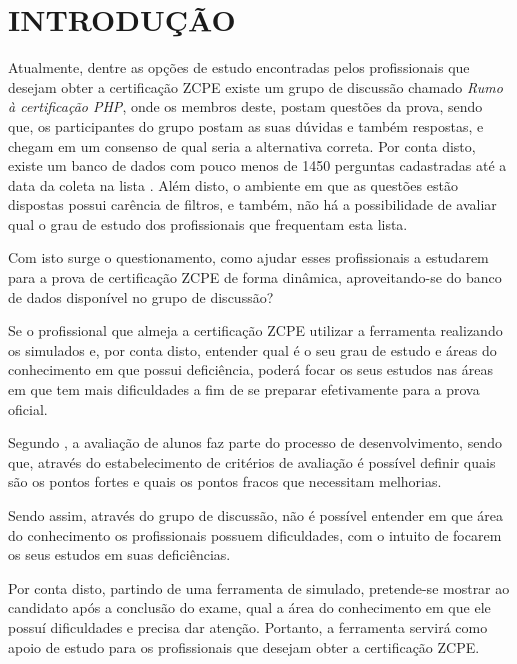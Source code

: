\chapter{INTRODUÇÃO}
\label{chp:intro}

Atualmente, dentre as opções de estudo encontradas pelos
profissionais que desejam obter a certificação \ac{ZCPE} existe um
grupo de discussão chamado \textit{Rumo à certificação PHP}, onde os membros
deste, postam questões da prova, sendo que, os participantes do grupo postam as
suas dúvidas e também respostas, e chegam em um consenso de qual seria a
alternativa correta. Por conta disto, existe um banco de dados com pouco menos
de 1450 perguntas cadastradas até a data da coleta na lista
\cite{googleGroupsRumoACertificaoPHP}. Além disto, o ambiente em que as
questões estão dispostas possui carência de filtros, e também, não há a
possibilidade de avaliar qual o grau de estudo dos profissionais que frequentam
esta lista.

Com isto surge o questionamento, como ajudar esses profissionais a estudarem
para a prova de certificação \acs{ZCPE} de forma dinâmica, aproveitando-se do 
banco de dados disponível no grupo de discussão?


Se o profissional que almeja a certificação \acs{ZCPE} utilizar a ferramenta
realizando os simulados e, por conta disto, entender qual é o seu grau de estudo e áreas
do conhecimento em que possui deficiência, poderá focar os seus estudos
nas áreas em que tem mais dificuldades a fim de se preparar efetivamente para a
prova oficial.


Segundo , a avaliação de
alunos faz parte do processo de desenvolvimento, sendo que, através do estabelecimento
de critérios de avaliação é possível definir quais são os pontos fortes e quais
os pontos fracos que necessitam melhorias.

Sendo assim, através do grupo de discussão, não é possível entender em
que área do conhecimento os profissionais possuem dificuldades, com o intuito de
focarem os seus estudos em suas deficiências.

Por conta disto, partindo de uma ferramenta de simulado, pretende-se mostrar ao
candidato após a conclusão do exame, qual a área do conhecimento em que ele
possuí dificuldades e precisa dar atenção. Portanto, a ferramenta servirá como apoio de
estudo para os profissionais que desejam obter a certificação \acs{ZCPE}.

